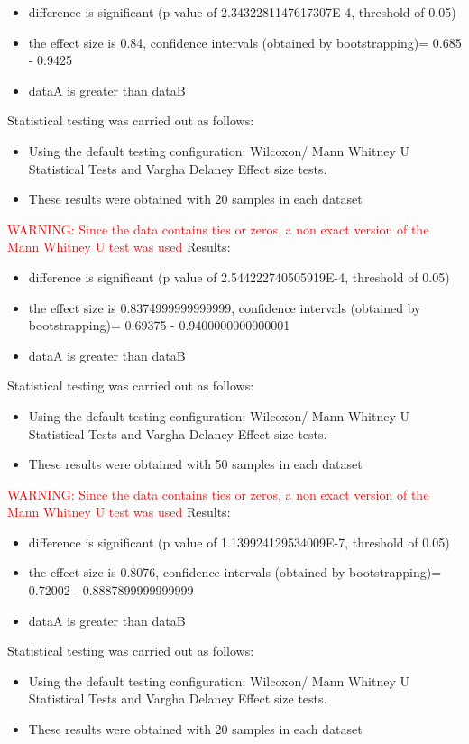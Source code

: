 \documentclass[]{article}
\begin{document}
\begin{itemize}
\item{difference is significant (p value of 2.3432281147617307E-4, threshold of 0.05)}
\item{the effect size is 0.84, confidence intervals (obtained by bootstrapping)= 0.685 - 0.9425}
\item{dataA is greater than dataB}
\end{itemize}Statistical testing was carried out as follows: \begin{itemize}
\item{Using the default testing configuration: Wilcoxon/ Mann Whitney U Statistical Tests and Vargha Delaney Effect size tests.}
\item{These results were obtained with 20 samples in each dataset}
\end{itemize}
\textcolor{Red}{WARNING: Since the data contains ties or zeros, a non exact version of the Mann Whitney U test was used
}
Results:
\begin{itemize}
\item{difference is significant (p value of 2.544222740505919E-4, threshold of 0.05)}
\item{the effect size is 0.8374999999999999, confidence intervals (obtained by bootstrapping)= 0.69375 - 0.9400000000000001}
\item{dataA is greater than dataB}
\end{itemize}Statistical testing was carried out as follows: \begin{itemize}
\item{Using the default testing configuration: Wilcoxon/ Mann Whitney U Statistical Tests and Vargha Delaney Effect size tests.}
\item{These results were obtained with 50 samples in each dataset}
\end{itemize}
\textcolor{Red}{WARNING: Since the data contains ties or zeros, a non exact version of the Mann Whitney U test was used
}
Results:
\begin{itemize}
\item{difference is significant (p value of 1.139924129534009E-7, threshold of 0.05)}
\item{the effect size is 0.8076, confidence intervals (obtained by bootstrapping)= 0.72002 - 0.8887899999999999}
\item{dataA is greater than dataB}
\end{itemize}Statistical testing was carried out as follows: \begin{itemize}
\item{Using the default testing configuration: Wilcoxon/ Mann Whitney U Statistical Tests and Vargha Delaney Effect size tests.}
\item{These results were obtained with 20 samples in each dataset}
\end{itemize}
\end{document}
